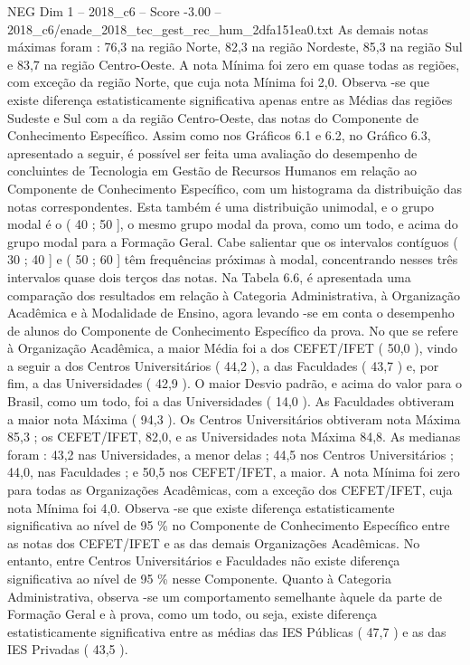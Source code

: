 \begin{textsample}{NEG Dim 1 – 2018\_c6 – Score -3.00 – 2018\_c6/enade\_2018\_tec\_gest\_rec\_hum\_2dfa151ea0.txt}
As demais notas máximas foram : 76,3 na região Norte, 82,3 na região Nordeste, 85,3 na região Sul e 83,7 na região Centro-Oeste.
A nota Mínima foi zero em quase todas as regiões, com exceção da região Norte, que cuja nota Mínima foi 2,0.
Observa -se que existe diferença estatisticamente significativa apenas entre as Médias das regiões Sudeste e Sul com a da região Centro-Oeste, das notas do Componente de Conhecimento Específico.
Assim como nos Gráficos 6.1 e 6.2, no Gráfico 6.3, apresentado a seguir, é possível ser feita uma avaliação do desempenho de concluintes de Tecnologia em Gestão de Recursos Humanos em relação ao Componente de Conhecimento Específico, com um histograma da distribuição das notas correspondentes.
Esta também é uma distribuição unimodal, e o grupo modal é o ( 40 ; 50 ], o mesmo grupo modal da prova, como um todo, e acima do grupo modal para a Formação Geral.
Cabe salientar que os intervalos contíguos ( 30 ; 40 ] e ( 50 ; 60 ] têm frequências próximas à modal, concentrando nesses três intervalos quase dois terços das notas.
Na Tabela 6.6, é apresentada uma comparação dos resultados em relação à Categoria Administrativa, à Organização Acadêmica e à Modalidade de Ensino, agora levando -se em conta o desempenho de alunos do Componente de Conhecimento Específico da prova.
No que se refere à Organização Acadêmica, a maior Média foi a dos CEFET/IFET ( 50,0 ), vindo a seguir a dos Centros Universitários ( 44,2 ), a das Faculdades ( 43,7 ) e, por fim, a das Universidades ( 42,9 ).
O maior Desvio padrão, e acima do valor para o Brasil, como um todo, foi a das Universidades ( 14,0 ).
As Faculdades obtiveram a maior nota Máxima ( 94,3 ).
Os Centros Universitários obtiveram nota Máxima 85,3 ; os CEFET/IFET, 82,0, e as Universidades nota Máxima 84,8.
As medianas foram : 43,2 nas Universidades, a menor delas ; 44,5 nos Centros Universitários ; 44,0, nas Faculdades ; e 50,5 nos CEFET/IFET, a maior.
A nota Mínima foi zero para todas as Organizações Acadêmicas, com a exceção dos CEFET/IFET, cuja nota Mínima foi 4,0.
Observa -se que existe diferença estatisticamente significativa ao nível de 95 \% no Componente de Conhecimento Específico entre as notas dos CEFET/IFET e as das demais Organizações Acadêmicas.
No entanto, entre Centros Universitários e Faculdades não existe diferença significativa ao nível de 95 \% nesse Componente.
Quanto à Categoria Administrativa, observa -se um comportamento semelhante àquele da parte de Formação Geral e à prova, como um todo, ou seja, existe diferença estatisticamente significativa entre as médias das IES Públicas ( 47,7 ) e as das IES Privadas ( 43,5 ).

\end{textsample}
